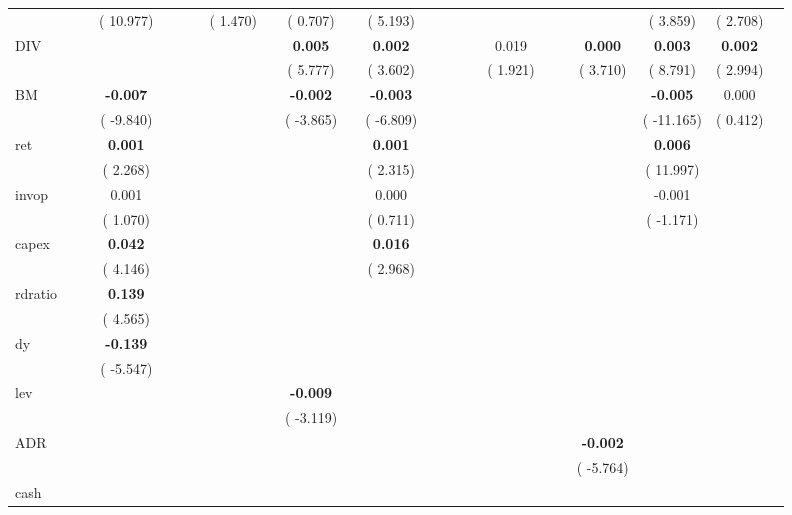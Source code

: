 \begin{sidewaystable}[h!]
{\begin{tabular}{l*{22}{c}}
& & &(  10.977) & & & &(   1.470) & &(   0.707) & &(   5.193) & & & & & & & & &(   3.859) &(   2.708) &\\ 
DIV &  &  &  &  &  &  &  &  &\textbf{   0.005}  &  &\textbf{   0.002}  &  &  &  &  &   0.019  &  &  &\textbf{   0.000}  &\textbf{   0.003}  &\textbf{   0.002}  &\\ 
& & & & & & & & &(   5.777) & &(   3.602) & & & & &(   1.921) & & &(   3.710) &(   8.791) &(   2.994) &\\ 
BM &  &  &\textbf{  -0.007}  &  &  &  &  &  &\textbf{  -0.002}  &  &\textbf{  -0.003}  &  &  &  &  &  &  &  &  &\textbf{  -0.005}  &   0.000  &\\ 
& & &(  -9.840) & & & & & &(  -3.865) & &(  -6.809) & & & & & & & & &( -11.165) &(   0.412) &\\ 
ret &  &  &\textbf{   0.001}  &  &  &  &  &  &  &  &\textbf{   0.001}  &  &  &  &  &  &  &  &  &\textbf{   0.006}  &  &\\ 
& & &(   2.268) & & & & & & & &(   2.315) & & & & & & & & &(  11.997) & &\\ 
invop &  &  &   0.001  &  &  &  &  &  &  &  &   0.000  &  &  &  &  &  &  &  &  &  -0.001  &  &\\ 
& & &(   1.070) & & & & & & & &(   0.711) & & & & & & & & &(  -1.171) & &\\ 
capex &  &  &\textbf{   0.042}  &  &  &  &  &  &  &  &\textbf{   0.016}  &  &  &  &  &  &  &  &  &  &  &\\ 
& & &(   4.146) & & & & & & & &(   2.968) & & & & & & & & & & &\\ 
rdratio &  &  &\textbf{   0.139}  &  &  &  &  &  &  &  &  &  &  &  &  &  &  &  &  &  &  &\\ 
& & &(   4.565) & & & & & & & & & & & & & & & & & & &\\ 
dy &  &  &\textbf{  -0.139}  &  &  &  &  &  &  &  &  &  &  &  &  &  &  &  &  &  &  &\\ 
& & &(  -5.547) & & & & & & & & & & & & & & & & & & &\\ 
lev &  &  &  &  &  &  &  &  &\textbf{  -0.009}  &  &  &  &  &  &  &  &  &  &  &  &  &\\ 
& & & & & & & & &(  -3.119) & & & & & & & & & & & & &\\ 
ADR &  &  &  &  &  &  &  &  &  &  &  &  &  &  &  &  &  &  &\textbf{  -0.002}  &  &  &\\ 
& & & & & & & & & & & & & & & & & & &(  -5.764) & & &\\ 
cash &  &  &  &  &  &  &  &  &  &  &  &  &  &  &  &  &  &  &  &  &  &\\ 

\end{tabular}}
\end{sidewaystable}
